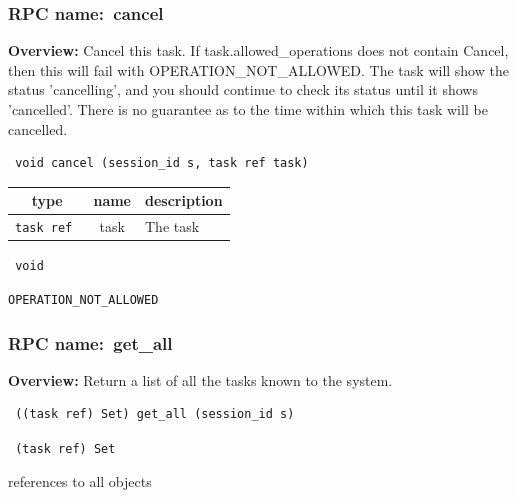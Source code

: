 \subsubsection{RPC name:~cancel}

{\bf Overview:} 
Cancel this task.  If task.allowed\_operations does not contain Cancel,
then this will fail with OPERATION\_NOT\_ALLOWED.  The task will show the
status 'cancelling', and you should continue to check its status until it
shows 'cancelled'.  There is no guarantee as to the time within which this
task will be cancelled.

\begin{verbatim} void cancel (session_id s, task ref task)\end{verbatim}



 
\vspace{0.3cm}
\begin{tabular}{|c|c|p{7cm}|}
 \hline
{\bf type} & {\bf name} & {\bf description} \\ \hline
{\tt task ref } & task & The task \\ \hline 

\end{tabular}

\vspace{0.3cm}

{\tt 
void
}



\vspace{0.3cm}

 {\tt OPERATION\_NOT\_ALLOWED}

\vspace{0.6cm}
\subsubsection{RPC name:~get\_all}

{\bf Overview:} 
Return a list of all the tasks known to the system.

\begin{verbatim} ((task ref) Set) get_all (session_id s)\end{verbatim}


\vspace{0.3cm}

{\tt 
(task ref) Set
}


references to all objects
\vspace{0.3cm}
\vspace{0.3cm}
\vspace{0.3cm}
